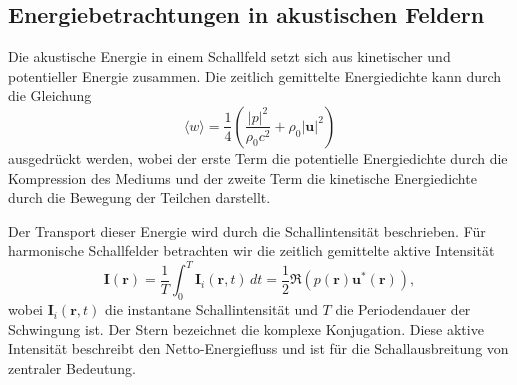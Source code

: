  
 
 

\subsection{Energiebetrachtungen in akustischen Feldern
\label{helmholtz:subsection:Energiebetrachtung}}
%
Die akustische Energie in einem Schallfeld setzt sich aus kinetischer
und potentieller Energie zusammen.
Die zeitlich gemittelte Energiedichte kann durch die Gleichung
%
\begin{equation*}
\langle w \rangle
=
\frac{1}{4}\left(\frac{|p|^2}{\rho_0 c^2} + \rho_0 |\boldsymbol{u}|^2 \right)
\end{equation*}
ausgedrückt werden,
wobei der erste Term die potentielle Energiedichte durch die
Kompression des Mediums und der zweite Term die kinetische
Energiedichte durch die Bewegung der Teilchen darstellt.

Der Transport dieser Energie wird durch die Schallintensität
beschrieben.
Für harmonische Schallfelder betrachten wir die zeitlich
gemittelte aktive Intensität
\begin{equation*}
\boldsymbol{I}(\boldsymbol{r})
=
\frac{1}{T}\int_0^T \boldsymbol{I}_i(\boldsymbol{r},t)\,dt
=
\frac{1}{2}\Re (p(\boldsymbol{r}) \boldsymbol{u}^*(\boldsymbol{r})),
\end{equation*}
wobei $\boldsymbol{I}_i(\boldsymbol{r},t)$ die instantane
Schallintensität und $T$ die Periodendauer der Schwingung ist.
Der Stern bezeichnet die komplexe Konjugation.
Diese aktive Intensität beschreibt den Netto-Energiefluss und ist
für die Schallausbreitung von zentraler Bedeutung.

